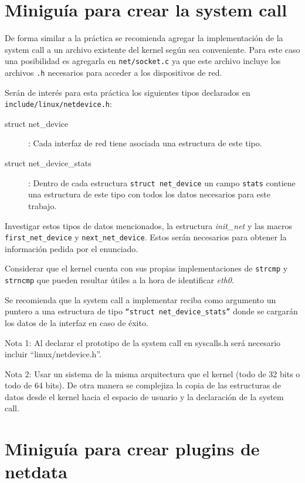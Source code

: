 \section{Miniguía para crear la system call}

De forma similar a la práctica se recomienda agregar la implementación de
la system call a un archivo
existente del kernel según sea conveniente. Para este caso una posibilidad es
agregarla en \texttt{net/socket.c} ya que este archivo incluye los archivos
\texttt{.h} necesarios para acceder a los dispositivos de red.

Serán de interés para esta práctica los siguientes tipos declarados en\\
\texttt{include/linux/netdevice.h}:

\begin{description}
    \item [struct net\_device]: Cada interfaz de red tiene asociada una
    estructura de este tipo.
    \item [struct net\_device\_stats]: Dentro de cada
        estructura \verb+struct net_device+ un campo \verb+stats+ contiene una
        estructura de este tipo con todos los datos necesarios para este
        trabajo.
\end{description}

Investigar estos tipos de datos mencionados, la estructura \textit{init\_net} y
las macros \texttt{first\_net\_device} y \texttt{next\_net\_device}. Estos
serán necesarios para obtener la información pedida por el enunciado.

Considerar que el kernel cuenta con sus propias implementaciones de
\texttt{strcmp} y \texttt{strncmp} que pueden resultar útiles a la hora de
identificar \textit{eth0}.

Se recomienda que la system call a implementar reciba como argumento un puntero
a una estructura de tipo \verb+“struct net_device_stats”+ donde se cargarán los
datos de la interfaz en caso de éxito.

Nota 1: Al declarar el prototipo de la system call en syscalls.h será necesario
incluir “linux/netdevice.h”.

Nota 2: Usar un sistema de la misma
arquitectura que el kernel (todo de 32 bits o todo de 64 bits). De otra manera
se complejiza la copia de las estructuras de datos desde el kernel hacia el
espacio de usuario y la declaración de la system call.

\section{Miniguía para crear plugins de netdata}

